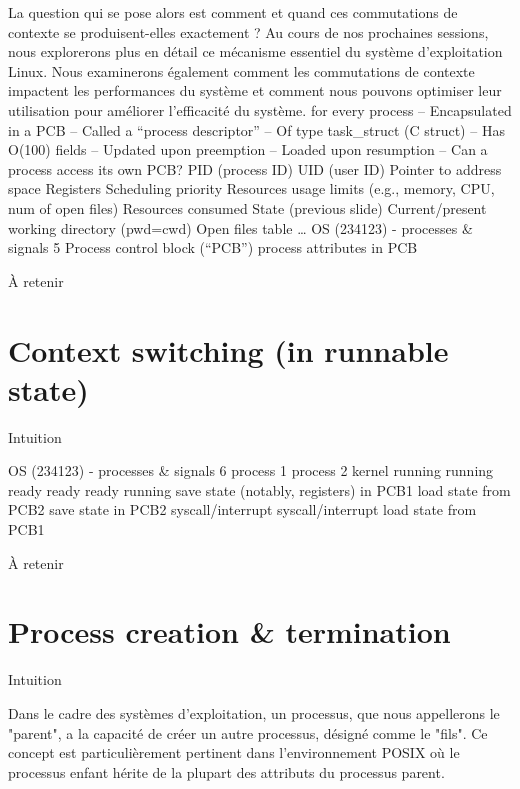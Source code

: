 \documentclass[12pt]{article}
\begin{document}
La question qui se pose alors est comment et quand ces commutations de contexte se produisent-elles exactement ? Au cours de nos prochaines sessions, nous explorerons plus en détail ce mécanisme essentiel du système d'exploitation Linux. Nous examinerons également comment les commutations de contexte impactent les performances du système et comment nous pouvons optimiser leur utilisation pour améliorer l'efficacité du système.
for every process
– Encapsulated in a  PCB
– Called a “process descriptor”
– Of type task\_struct (C struct)
– Has O(100) fields
– Updated upon preemption
– Loaded upon resumption
– Can a process access its own
PCB?
PID (process ID)
UID (user ID)
Pointer to address space
Registers
Scheduling priority
Resources usage limits (e.g.,
memory, CPU, num of open files)
Resources consumed
State (previous slide)
Current/present working
directory (pwd=cwd)
Open files table
…
OS (234123) - processes \& signals
5
Process control block (“PCB”)
process attributes
in PCB
\begin{aretenir}{À retenir}
\end{aretenir}

\section{Context switching (in runnable state)}
\begin{myvulga}{Intuition}
\end{myvulga}
OS (234123) - processes \& signals
6
process 1
process 2
kernel
running
running
ready
ready
ready
running
save state (notably, registers) in PCB1
load state from PCB2
save state in PCB2
syscall/interrupt
syscall/interrupt
load state from PCB1
\begin{aretenir}{À retenir}
\end{aretenir}

\section{Process creation \& termination}
\begin{myvulga}{Intuition}
\end{myvulga}
Dans le cadre des systèmes d'exploitation, un processus, que nous appellerons le "parent", a la capacité de créer un autre processus, désigné comme le "fils". Ce concept est particulièrement pertinent dans l'environnement POSIX où le processus enfant hérite de la plupart des attributs du processus parent. 
\end{document}
